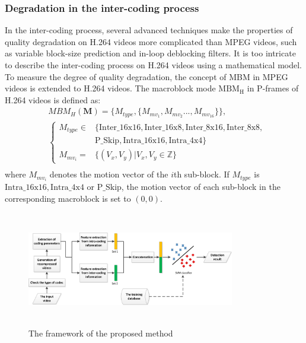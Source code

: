 \documentclass[journal,sort]{IEEEtran}
\begin{document}
\subsubsection{Degradation in the inter-coding process \label{degrad-inter_h264}}
In the inter-coding process, several advanced techniques make the properties of quality degradation on H.264 videos more complicated than MPEG videos, such as variable block-size prediction and in-loop deblocking filters. It is too intricate to describe the inter-coding process on H.264 videos using a mathematical model. To measure the degree of quality degradation, the concept of MBM in MPEG videos is extended to H.264 videos. The macroblock mode $\text{MBM}_{\text{H}}$ in P-frames of H.264 videos is defined as: 
\begin{equation}
\begin{aligned}
&MBM_{H}(\mathbf{M}) = \{M_{type},\{M_{mv_1},M_{mv_2}...,M_{mv_{16}}\}\},\\
& \begin{cases}
M_{type}\in&\{\text{Inter}\_\text{16x16},\text{Inter}\_\text{16x8},\text{Inter}\_\text{8x16},\text{Inter}\_\text{8x8},\\
&\text{P}\_\text{Skip},\text{Intra}\_\text{16x16},\text{Intra}\_\text{4x4}\} \\
M_{mv_i}=&\{(V_x,V_y)|V_x,V_y\in \mathbb{Z}\}
\end{cases}\\
\end{aligned}
\end{equation}
where $M_{mv_i}$ denotes the motion vector of the $i$th sub-block. If $M_{type}$ is $\text{Intra}\_\text{16x16},\text{Intra}\_\text{4x4}$ or $\text{P}\_\text{Skip}$, the motion vector of each sub-block in the corresponding macroblock is set to $(0, 0)$. 

 \begin{figure}[ht!]
 	\centering
 	\includegraphics[width=0.81\textwidth,height=5cm]{detection_pipeline.png}
 	\caption{\label{Fig.framework}The framework of the proposed method}
 \end{figure}
\end{document}
